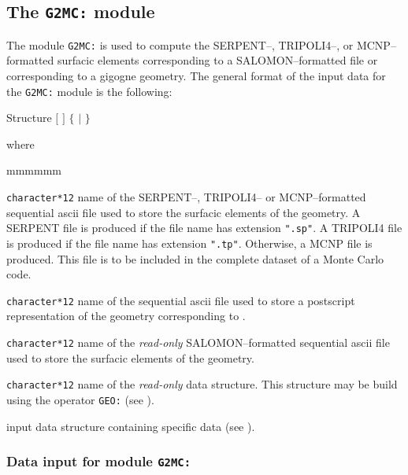 \subsection{The {\tt G2MC:} module}\label{sect:G2MCData}

The module {\tt G2MC:} is used to compute the SERPENT--, TRIPOLI4--, or MCNP--formatted surfacic elements corresponding
to a SALOMON--formatted file or corresponding to a gigogne geometry. The general format of the input data for the
{\tt G2MC:} module is the following:
\begin{DataStructure}{Structure }
 $[$  $]$ \moc{:=}  $\{$  $|$  $\}$ ~\moc{::}~ \\
\end{DataStructure}

\noindent where
\begin{ListeDeDescription}{mmmmmm}

\item[\dusa{MCFIL}] \texttt{character*12} name of the SERPENT--, TRIPOLI4-- or MCNP--formatted sequential {\sc ascii}
file used to store the surfacic elements of the geometry. A SERPENT file is
produced if the file name has extension {\tt ".sp"}. A TRIPOLI4 file is
produced if the file name has extension {\tt ".tp"}. Otherwise, a MCNP file is
produced. This file is to be included in the complete dataset of a Monte Carlo code.

\item[\dusa{PSFIL}] \texttt{character*12} name of the sequential {\sc ascii}
file used to store a postscript representation of the geometry corresponding to .

\item[\dusa{SURFIL}] \texttt{character*12} name of the {\sl read-only} SALOMON--formatted sequential {\sc ascii}
file used to store the surfacic elements of the geometry.

\item[\dusa{GEONAM}] {\tt character*12} name of the {\sl read-only}  data
structure. This structure may be build using the operator {\tt GEO:} (see ).

\item[\dusa{G2MC\_data}] input data structure containing specific data (see ).

\end{ListeDeDescription}

\subsubsection{Data input for module {\tt G2MC:}}\label{sect:descG2MC}

